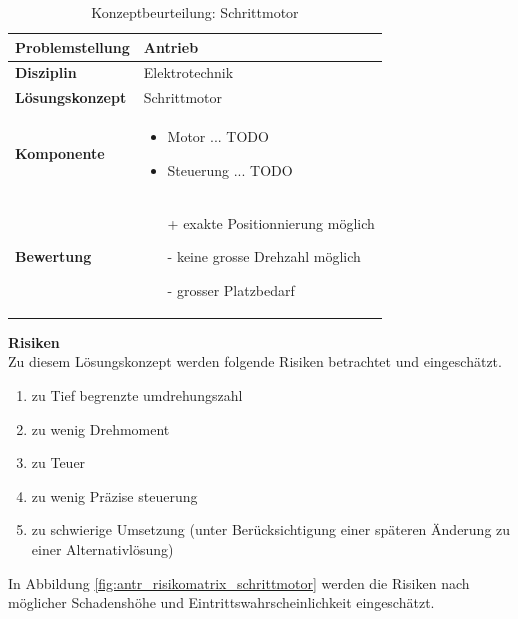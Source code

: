 \documentclass[../../../main.tex]{subfiles}
\begin{document}
    \begin{flushleft}
        \begin{table}[H]
        \begin{tabular}{ | l | p{11cm} |}
        \hline
        \textbf{Problemstellung} & Antrieb \\ \hline
        \textbf{Disziplin} & Elektrotechnik \\ \hline
        \textbf{Lösungskonzept} & Schrittmotor\\ \hline
        \textbf{Komponente} & \begin{itemize}
            \item Motor ... TODO
            \item Steuerung ... TODO
            \end{itemize}\\ \hline
        \textbf{Bewertung} &  \begin{itemize} 
                                \item[+] exakte Positionnierung möglich
                                \item[-] keine grosse Drehzahl möglich
                                \item[-] grosser Platzbedarf
                              \end{itemize} \\ \hline
        \end{tabular}
        \caption{Konzeptbeurteilung: Schrittmotor}
        \label{tab:antr_konzept_schrittmotor}
    \end{table}
    \end{flushleft}
    

    \textbf{Risiken}\\
    Zu diesem Lösungskonzept werden folgende Risiken betrachtet und eingeschätzt.
    \begin{enumerate}[I]
        \item zu Tief begrenzte umdrehungszahl
        \item zu wenig Drehmoment
        \item zu Teuer
        \item zu wenig Präzise steuerung
        \item zu schwierige Umsetzung (unter Berücksichtigung einer späteren Änderung zu einer Alternativlösung)        
    \end{enumerate}

    In Abbildung \ref{fig:antr_risikomatrix_schrittmotor} werden die Risiken nach möglicher Schadenshöhe und Eintrittswahrscheinlichkeit eingeschätzt.
\end{document}
